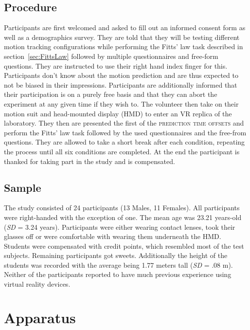 \documentclass[sigconf]{acmart}
\begin{document}
\subsection{Procedure}
Participants are first welcomed and asked to fill out an informed consent form as well as a demographics survey.
They are told that they will be testing different motion tracking configurations while performing the Fitts' law task described in section~\ref{sec:FittsLaw} followed by multiple questionnaires and free-form questions. They are instructed to use their right hand index finger for this. 
Participants don't know about the motion prediction and are thus expected to not be biased in their impressions. Participants are additionally informed that their participation is on a purely free basis and that they can abort the experiment at any given time if they wish to. The volunteer then take on their motion suit and head-mounted display (HMD) to enter an VR replica of the laboratory. They then are presented the first of the \textsc{prediction time offsets} and perform the Fitts' law task followed by the used questionnaires and the free-from questions. They are allowed to take a short break after each condition, repeating the process until all six conditions are completed. At the end the participant is thanked for taking part in the study and is compensated.

\subsection{Sample}
The study consisted of 24 participants (13 Males, 11 Females). All participants were right-handed with the exception of one. The mean age was 23.21 years-old (\textit{SD} = 3.24 years).
Participants were either wearing contact lenses, took their glasses off or were comfortable with wearing them underneath the HMD. Students were compensated with credit points, which resembled most of the test subjects. Remaining participants got sweets. Additionally the height of the students was recorded with the average being 1.77 meters tall (\textit{SD} = .08 m). Neither of the participants reported to have much previous experience using virtual reality devices. 

\section{Apparatus}\label{tit:Apparatus}
\end{document}
